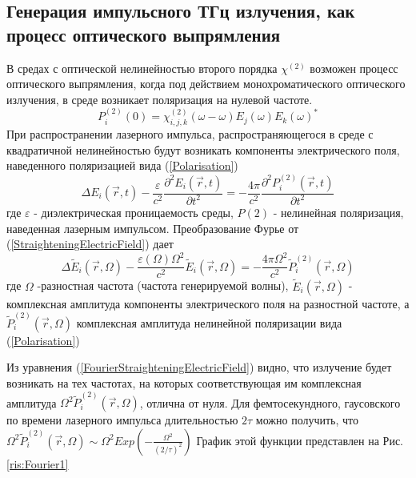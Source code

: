 \documentclass[a4paper,14pt,russian]{extreport}
\begin{document}
			\subsection{Генерация импульсного ТГц излучения, как процесс оптического выпрямления}
				В средах с оптической нелинейностью второго порядка $\chi^{(2)}$ возможен процесс оптического выпрямления, когда под действием монохроматического оптического излучения, в среде возникает поляризация на нулевой частоте.
				\begin{equation}\label{Polarisation}
					P_i^{(2)}(0) = \chi^{(2)}_{i,j,k}(\omega - \omega)E_j(\omega)E_k(\omega)^*
				\end{equation}
				При распространении лазерного импульса, распространяющегося в среде с квадратичной нелинейностью будут возникать компоненты электрического поля, наведенного поляризацией вида (\ref{Polarisation})
				\begin{equation}\label{StraighteningElectricField}
					\Delta E_i(\vec{r},t) - 
					\frac{\varepsilon}{c^2}\frac{\partial^2 E_i(\vec{r},t)}{\partial t^2} = 
					- \frac{4 \pi}{c^2} \frac{\partial^2 P_i^{(2)}(\vec{r},t)}{\partial t^2}
				\end{equation}
				где $\varepsilon$ - диэлектрическая проницаемость среды, $P{(2)}$ - нелинейная поляризация,
наведенная лазерным импульсом. Преобразование Фурье от (\ref{StraighteningElectricField}) дает
				\begin{equation}\label{FourierStraighteningElectricField}
					\Delta \tilde{E}_i(\vec{r},\Omega) - 
					\frac{\varepsilon(\Omega)\Omega^2}{c^2} \tilde{E}_i(\vec{r},\Omega) = 
					- \frac{4 \pi \Omega^2}{c^2} \tilde{P}_i^{(2)}(\vec{r},\Omega)
				\end{equation}
				где $\Omega$ -разностная частота (частота генерируемой волны), $\tilde{E}_i(\vec{r},\Omega)$ - комплексная амплитуда компоненты электрического поля на разностной частоте, а $\tilde{P}_i^{(2)}(\vec{r},\Omega)$ комплексная амплитуда нелинейной поляризации вида (\ref{Polarisation})\par
				Из уравнения (\ref{FourierStraighteningElectricField}) видно, что излучение будет возникать на тех частотах, на которых соответствующая им комплексная амплитуда $\Omega^2 \tilde{P}_i^{(2)}(\vec{r},\Omega)$, отлична от нуля. Для фемтосекундного, гаусовского по времени лазерного импульса длительностью $2\tau$ можно получить, что $\Omega^2 \tilde{P}_i^{(2)}(\vec{r},\Omega) \sim \Omega^2 Exp\left( - \frac{\Omega^2}{(2/\tau)^2}\right)$ График этой функции представлен на Рис. \ref{ris:Fourier1}\par
\end{document}
